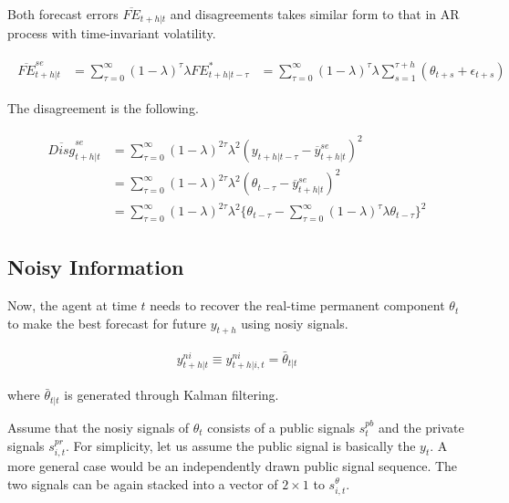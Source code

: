 \documentclass[]{article}
\begin{document}
Both forecast errors $\overline{FE}_{t+h|t}$ and disagreements takes similar form to that in AR process with time-invariant volatility. 


\begin{eqnarray}
\begin{split}
\overline {FE}^{se}_{t+h|t} & = \sum^{\infty}_{\tau=0} (1-\lambda)^\tau\lambda {FE}^*_{t+h|t-\tau} 
& = \sum^{\infty}_{\tau=0} (1-\lambda)^\tau\lambda \sum^{\tau+h}_{s=1} (\theta_{t+s} + \epsilon_{t+s})  
\end{split} 
\end{eqnarray}

The disagreement is the following. 


\begin{eqnarray}
\begin{split}
\overline{Disg}^{se}_{t+h|t} & =  \sum^{\infty}_{\tau=0} (1-\lambda)^{2\tau} \lambda^2 (y_{t+h|t-\tau} - \overline y^{se}_{t+h|t})^2  \\
& = \sum^{\infty}_{\tau=0} (1-\lambda)^{2\tau} \lambda^2 (\theta_{t-\tau} - \overline y^{se}_{t+h|t})^2  \\
& = \sum^{\infty}_{\tau=0} (1-\lambda)^{2\tau} \lambda^2 \{\theta_{t-\tau} - \sum^{\infty}_{\tau=0} (1-\lambda)^\tau\lambda \theta_{t-\tau}\}^2  
\end{split} 
\end{eqnarray}

\subsection{Noisy Information}


Now, the agent at time $t$ needs to recover the real-time permanent component $\theta_t$ to make the best forecast for future $y_{t+h}$ using nosiy signals.   


\begin{eqnarray}
y^{ni}_{t+h|t}  \equiv  y^{ni}_{t+h|i,t} = \bar \theta_{t|t}
\end{eqnarray}

where $\bar \theta_{t|t}$ is generated through Kalman filtering.  

Assume that the nosiy signals of $\theta_t$ consists of a public signals $s^{pb}_{t}$ and the private signals $s^{pr}_{i,t}$. For simplicity, let us assume the public signal is basically the $y_t$. A more general case would be an independently drawn public signal sequence. The two signals can be again stacked into a vector of $2\times 1$ to $s^\theta_{i,t}$. 
\end{document}
